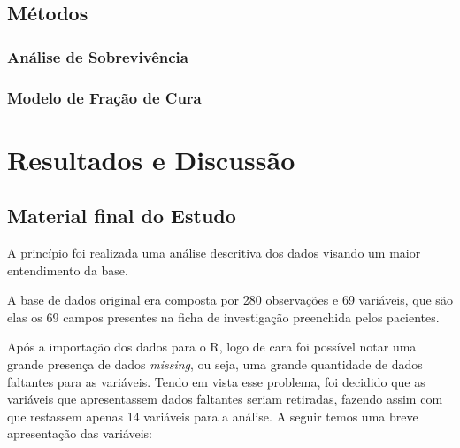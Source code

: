 \documentclass[
	12pt,				%
	openright,			%
	oneside,			%
	a4paper,			%
	brazil				%
	]{abntex2}
\begin{document}
\hypertarget{muxe9todos}{%
\section{Métodos}\label{muxe9todos}}

\hypertarget{anuxe1lise-de-sobrevivuxeancia}{%
\subsection{Análise de Sobrevivência}\label{anuxe1lise-de-sobrevivuxeancia}}

\hypertarget{modelo-de-frauxe7uxe3o-de-cura}{%
\subsection{Modelo de Fração de Cura}\label{modelo-de-frauxe7uxe3o-de-cura}}

\hypertarget{resultados-e-discussuxe3o}{%
\chapter{Resultados e Discussão}\label{resultados-e-discussuxe3o}}

\bigskip

\hypertarget{material-final-do-estudo}{%
\section{Material final do Estudo}\label{material-final-do-estudo}}

A princípio foi realizada uma análise descritiva dos dados visando um maior entendimento da base.

A base de dados original era composta por 280 observações e 69 variáveis, que são elas os 69 campos presentes na ficha de investigação preenchida pelos pacientes.

Após a importação dos dados para o R, logo de cara foi possível notar uma grande presença de dados \emph{missing}, ou seja, uma grande quantidade de dados faltantes para as variáveis. Tendo em vista esse problema, foi decidido que as variáveis que apresentassem dados faltantes seriam retiradas, fazendo assim com que restassem apenas 14 variáveis para a análise. A seguir temos uma breve apresentação das variáveis:
\end{document}
